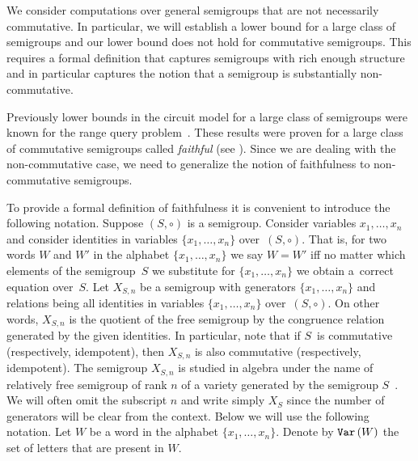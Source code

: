 \documentclass{toc}
\begin{document}
We consider computations over general semigroups that are not necessarily
commutative. In particular, we will establish a lower bound for a large class of
semigroups and our lower bound does not hold for commutative semigroups. This
requires a formal definition that captures semigroups with rich enough structure
and in particular %
captures the notion   %
that a semigroup is substantially non-commutative.

Previously lower bounds in the circuit model for a large class of semigroups
were known for
the range query
problem~\cite{DBLP:conf/stoc/Yao82,DBLP:journals/ijcga/ChazelleR91}. These
results were proven for a large class of commutative semigroups called
\emph{faithful} (see ). Since we are dealing
with the non-commutative case, we need to generalize the notion of faithfulness
to non-commutative semigroups.

To provide a formal definition of faithfulness it is convenient to introduce the
following notation. Suppose $(S, \circ)$ is a
semigroup.  %
Consider variables $x_1,\ldots, x_n$ and consider identities in variables $\{x_1,\ldots, x_n\}$ over~$(S,\circ)$.
That is, for two words $W$ and $W'$ in
the alphabet $\{x_1,\ldots,x_n\}$ we say $W = W'$ iff no matter
which elements of the semigroup~$S$ we substitute for $\{x_1,\ldots, x_n\}$ we
obtain a~correct equation over~$S$.
Let $X_{S,n}$ be a semigroup with generators $\{x_1,\ldots, x_n\}$
and relations being all identities in variables $\{x_1,\ldots, x_n\}$ over~$(S,\circ)$. 
On other words, $X_{S,n}$ is the quotient of the free semigroup by the congruence relation generated by the given identities.
In particular, note that if $S$~is
commutative (respectively, idempotent), then $X_{S,n}$ is also commutative
(respectively, idempotent).
The semigroup $X_{S,n}$ is studied in algebra under the name of relatively free
semigroup of rank $n$ of a variety generated by
the   %
semigroup
$S$~\cite{neumann2012varieties}. %
We will often omit the subscript $n$ and write
simply $X_S$ since the number of generators will be clear from the context.
Below we will use the following notation. Let $W$ be a word in the alphabet
$\{x_1,\ldots, x_n\}$. Denote by $\texttt{Var}\,(W)$ the set of letters that are present
in $W$.
\end{document}
